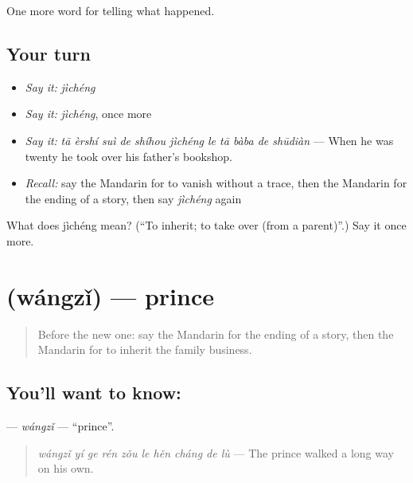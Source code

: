\begin{grammarlens}[title={What you've built}]
One more word for telling what happened.
\end{grammarlens}

\subsection*{Your turn}
\begin{itemize}
\raggedright
  \item \emph{Say it:} \emph{jìchéng}
  \item \emph{Say it:} \emph{jìchéng}, once more
  \item \emph{Say it:} \emph{tā èrshí suì de shíhou jìchéng le tā bàba de shūdiàn} — When he was twenty he took over his father's bookshop.
  \item \emph{Recall:} say the Mandarin for to vanish without a trace, then the Mandarin for the ending of a story, then say \emph{jìchéng} again
\end{itemize}

\begin{tcolorbox}[breakable,colback=teal!4,colframe=teal!35!black,title={Before you move on}]
What does jìchéng mean? (\textquotedblleft{}To inherit; to take over (from a parent)\textquotedblright{}.) Say it once more.
\end{tcolorbox}
\section[\texorpdfstring{\zh{王子} (wángzǐ)}{王子 (wángzǐ)}]{ (wángzǐ) — prince}

\label{lesson:ZH-C330-wangzi}



\begin{quote}
Before the new one: say the Mandarin for the ending of a story, then the Mandarin for to inherit the family business.
\end{quote}

\subsection*{You'll want to know: }
\textbf{} — \emph{wángzǐ} — \textquotedblleft{}prince\textquotedblright{}.

\begin{quote}
\textbf{} \emph{wángzǐ yí ge rén zǒu le hěn cháng de lù} — The prince walked a long way on his own.
\end{quote}

